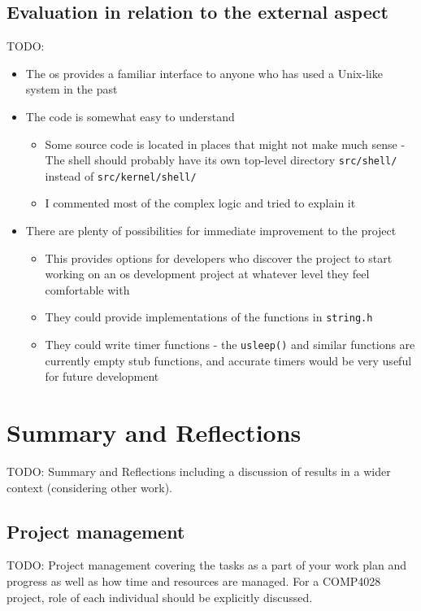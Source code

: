 \documentclass{article}
\begin{document}
\subsection{Evaluation in relation to the external aspect}
TODO:
\begin{itemize}
    \item The \gls{os} provides a familiar interface to anyone who has used a
        Unix-like system in the past
    \item The code is somewhat easy to understand
        \begin{itemize}
            \item Some source code is located in places that might not make
                much sense - The shell should probably have its own top-level
                directory \verb!src/shell/! instead of \verb!src/kernel/shell/!
            \item I commented most of the complex logic and tried to explain it
        \end{itemize}
    \item There are plenty of possibilities for immediate improvement to the
        project
        \begin{itemize}
            \item This provides options for developers who discover the project
                to start working on an \gls{os} development project at whatever
                level they feel comfortable with
            \item They could provide implementations of the functions in
                \verb!string.h!
            \item They could write timer functions - the \verb!usleep()! and
                similar functions are currently empty stub functions, and
                accurate timers would be very useful for future development
        \end{itemize}
\end{itemize}

\section{Summary and Reflections}
TODO: Summary and Reflections including a discussion of results in a wider
context (considering other work).

\subsection{Project management}
TODO: Project management covering the tasks as a part of your work plan and
progress as well as how time and resources are managed. For a COMP4028 project,
role of each individual should be explicitly discussed.
\end{document}
